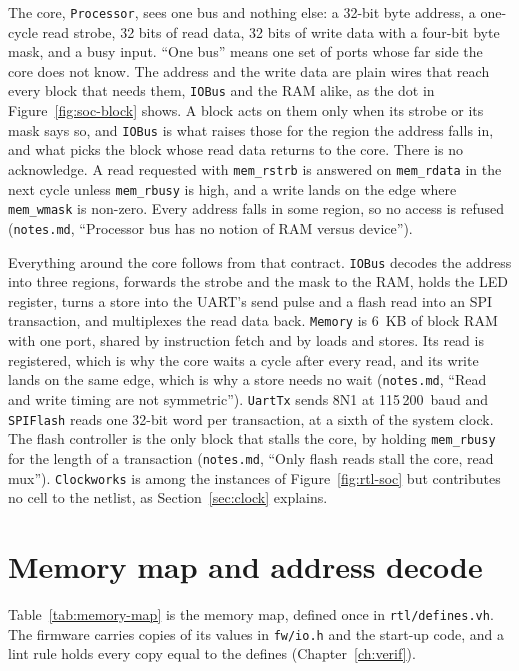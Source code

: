 \documentclass[11pt,a4paper]{report}
\newcommand{\notes}[1]{(\texttt{notes.md}, ``#1'')}
\begin{document}
The core, \texttt{Processor}, sees one bus and nothing else: a 32-bit byte address, a
one-cycle read strobe, 32 bits of read data, 32 bits of write data with a four-bit byte
mask, and a busy input. ``One bus'' means one set of ports whose far side the core does not
know. The address and the write data are
plain wires that reach every block that needs them, \texttt{IOBus} and the RAM alike, as the
dot in Figure~\ref{fig:soc-block} shows. A block acts on them only when its strobe or its mask
says so, and \texttt{IOBus} is what raises those for the region the address falls in, and
what picks the block whose read data returns to the core. There is no acknowledge. A read requested with \texttt{mem\_rstrb}
is answered on \texttt{mem\_rdata} in the next cycle unless \texttt{mem\_rbusy} is high, and
a write lands on the edge where \texttt{mem\_wmask} is non-zero. Every address falls in
some region, so no access is refused \notes{Processor bus has no notion of RAM versus
device}.

Everything around the core follows from that contract. \texttt{IOBus} decodes the address
into three regions, forwards the strobe and the mask to the RAM, holds the LED register,
turns a store into the UART's send pulse and a flash read into an SPI transaction, and
multiplexes the read data back. \texttt{Memory} is 6~KB of block RAM with one port, shared
by instruction fetch and by loads and stores. Its read is registered, which is why the core
waits a cycle after every read, and its write lands on the same edge, which is why a store
needs no wait \notes{Read and write timing are not symmetric}. \texttt{UartTx} sends 8N1 at
115\,200~baud and \texttt{SPIFlash} reads one 32-bit word per transaction, at a sixth of the
system clock. The flash controller is the only block that stalls the core, by holding
\texttt{mem\_rbusy} for the length of a transaction \notes{Only flash reads stall the core,
read mux}. \texttt{Clockworks} is among the instances of Figure~\ref{fig:rtl-soc} but
contributes no cell to the netlist, as Section~\ref{sec:clock} explains.

\section{Memory map and address decode}
\label{sec:memmap}

Table~\ref{tab:memory-map} is the memory map, defined once in \texttt{rtl/defines.vh}. The
firmware carries copies of its values in \texttt{fw/io.h} and the start-up code, and a lint
rule holds every copy equal to the defines (Chapter~\ref{ch:verif}).
\end{document}
